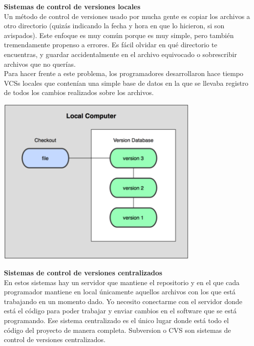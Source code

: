 \begin{itemize}
\textbf{Sistemas de control de versiones locales}\\
Un método de control de versiones usado por mucha gente es copiar los archivos a otro directorio (quizás indicando la fecha y hora en que lo hicieron, si son avispados). Este enfoque es muy común porque es muy simple, pero también tremendamente propenso a errores. Es fácil olvidar en qué directorio te encuentras, y guardar accidentalmente en el archivo equivocado o sobrescribir archivos que no querías.\\

Para hacer frente a este problema, los programadores desarrollaron hace tiempo VCSs locales que contenían una simple base de datos en la que se llevaba registro de todos los cambios realizados sobre los archivos.
\end{itemize}

\begin{center}
\includegraphics[width=10cm]{./Imagenes/local} 
\end{center}

\begin{itemize}
\textbf{Sistemas de control de versiones centralizados}\\
En estos sistemas hay un servidor que mantiene el repositorio y en el que cada programador mantiene en local únicamente aquellos archivos con los que está trabajando en un momento dado. Yo necesito conectarme con el servidor donde está el código para poder trabajar y enviar cambios en el software que se está programando. Ese sistema centralizado es el único lugar donde está todo el código del proyecto de manera completa. Subversion o CVS son sistemas de control de versiones centralizados.
\end{itemize}

